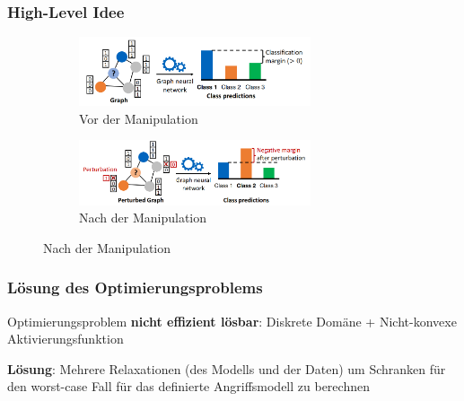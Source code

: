 \documentclass{beamer}
\begin{document}
\begin{frame}
  \frametitle{High-Level Idee}

  \begin{figure}[H]
    \centering
    \begin{subfigure}[b]{1\textwidth}
      \centering
      \includegraphics[width=0.75\textwidth]{img/before_pert.png}
      \caption*{Vor der Manipulation \cite{}}
    \end{subfigure}
    \par\bigskip
    \begin{subfigure}[b]{1\textwidth}
      \centering
      \includegraphics[width=0.75\textwidth]{img/after_pert.png}
      \caption*{Nach der Manipulation \cite{}}
    \end{subfigure}
  \end{figure}
\end{frame}

\begin{frame}
  \frametitle{Lösung des Optimierungsproblems}
  Optimierungsproblem \textbf{nicht effizient lösbar}: Diskrete Domäne + Nicht-konvexe Aktivierungsfunktion\newline

  \textbf{Lösung}: Mehrere Relaxationen (des Modells und der Daten) um Schranken für den worst-case Fall für das definierte Angriffsmodell zu berechnen
\end{frame}
\end{document}
